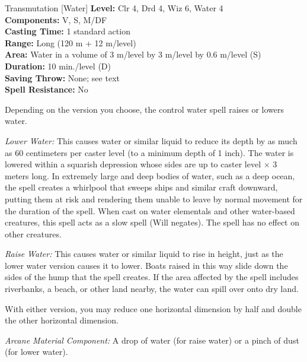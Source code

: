{Transmutation [Water]}
{
	\textbf{Level:}
	Clr 4, Drd 4, Wiz 6, Water 4\\
	\textbf{Components:}
	V, S, M/DF\\
	\textbf{Casting Time:}
	1 standard action\\
	\textbf{Range:}
	Long (120 m + 12 m/level)\\
	\textbf{Area:}
	Water in a volume of 3 m/level by 3 m/level by 0.6 m/level (S)\\
	\textbf{Duration:}
	10 min./level (D)\\
	\textbf{Saving Throw:}
	None; see text\\
	\textbf{Spell Resistance:}
	No\\
}
{
	Depending on the version you choose, the control water spell raises or lowers water.

	\textit{Lower Water:}
	This causes water or similar liquid to reduce its depth by as much as 60 centimeters per caster level (to a minimum depth of 1 inch). The water is lowered within a squarish depression whose sides are up to caster level $\times$ 3 meters long. In extremely large and deep bodies of water, such as a deep ocean, the spell creates a whirlpool that sweeps ships and similar craft downward, putting them at risk and rendering them unable to leave by normal movement for the duration of the spell. When cast on water elementals and other water-based creatures, this spell acts as a slow spell (Will negates). The spell has no effect on other creatures.

	\textit{Raise Water:}
	This causes water or similar liquid to rise in height, just as the lower water version causes it to lower. Boats raised in this way slide down the sides of the hump that the spell creates. If the area affected by the spell includes riverbanks, a beach, or other land nearby, the water can spill over onto dry land.

	With either version, you may reduce one horizontal dimension by half and double the other horizontal dimension.

	\textit{Arcane Material Component:}
	A drop of water (for raise water) or a pinch of dust (for lower water).

}
